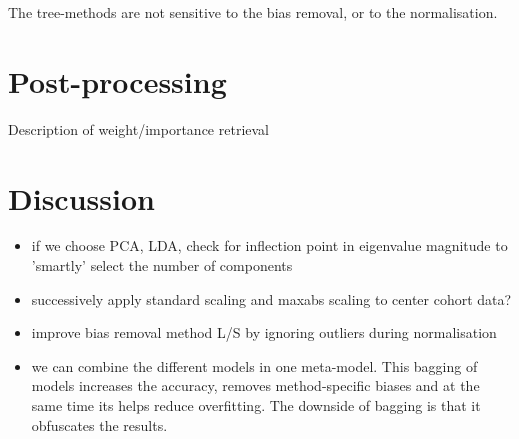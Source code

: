 \documentclass[a4paper,10pt]{article}
\begin{document}
\begin{tabular}{l|c}
 
\end{tabular} 
%

The tree-methods are not sensitive to the bias removal, or to the normalisation.

\section{Post-processing}
%
Description of weight/importance retrieval

\section{Discussion}

\begin{itemize}
\item if we choose PCA, LDA, check for inflection point in eigenvalue magnitude to 'smartly' select the number of components
\item successively apply standard scaling and maxabs scaling to center cohort data?
\item improve bias removal method L/S by ignoring outliers during normalisation
\item we can combine the different models in one meta-model. This bagging of models increases the accuracy, removes method-specific biases and at the same time its helps reduce overfitting.
The downside of bagging is that it obfuscates the results.
\end{itemize}



\end{document}
